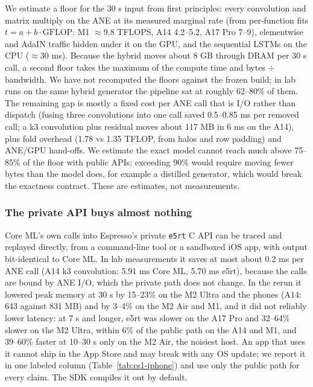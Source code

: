 \documentclass[11pt]{article}
\newcommand{\code}[1]{\texttt{#1}}
\begin{document}
We estimate a floor for the 30 s input from first principles: every convolution and matrix multiply on the ANE at its measured marginal rate (from per-function fits $t = a + b\cdot\text{GFLOP}$: M1 $\approx$9.8 TFLOPS, A14 4.2--5.2, A17 Pro 7--9), elementwise and AdaIN traffic hidden under it on the GPU, and the sequential LSTMs on the CPU ($\approx$30 ms). Because the hybrid moves about 8 GB through DRAM per 30 s call, a second floor takes the maximum of the compute time and bytes $\div$ bandwidth. We have not recomputed the floors against the frozen build; in lab runs on the same hybrid generator the pipeline sat at roughly 62--80\% of them. The remaining gap is mostly a fixed cost per ANE call that is I/O rather than dispatch (fusing three convolutions into one call saved 0.5--0.85 ms per removed call; a k3 convolution plus residual moves about 117 MB in 6 ms on the A14), plus fold overhead (1.78 vs 1.35 TFLOP, from halos and row padding) and ANE/GPU hand-offs. We estimate the exact model cannot reach much above 75--85\% of the floor with public APIs; exceeding 90\% would require moving fewer bytes than the model does, for example a distilled generator, which would break the exactness contract. These are estimates, not measurements.

\subsubsection{The private API buys almost nothing}\label{sec:cs1-e5rt}

Core ML's own calls into Espresso's private \code{e5rt} C API can be traced and replayed directly, from a command-line tool or a sandboxed iOS app, with output bit-identical to Core ML. In lab measurements it saves at most about 0.2 ms per ANE call (A14 k3 convolution: 5.91 ms Core ML, 5.70 ms e5rt), because the calls are bound by ANE I/O, which the private path does not change. In the rerun it lowered peak memory at 30 s by 15--23\% on the M2 Ultra and the phones (A14: 643 against 831 MB) and by 3--4\% on the M2 Air and M1, and it did not reliably lower latency: at 7 s and longer, e5rt was slower on the A17 Pro and 32--64\% slower on the M2 Ultra, within 6\% of the public path on the A14 and M1, and 39--60\% faster at 10--30 s only on the M2 Air, the noisiest host. An app that uses it cannot ship in the App Store and may break with any OS update; we report it in one labeled column (Table~\ref{tab:cs1-iphone}) and use only the public path for every claim. The SDK compiles it out by default.
\end{document}
